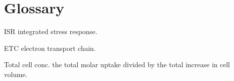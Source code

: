 \chapter*{Glossary}      %
\thispagestyle{plain}
%
\begin{glossary}
\item[ISR] integrated stress response.
\item[ETC] electron transport chain.
\item[Total cell conc.] the total molar uptake divided by the total increase in cell volume.
 
\end{glossary}